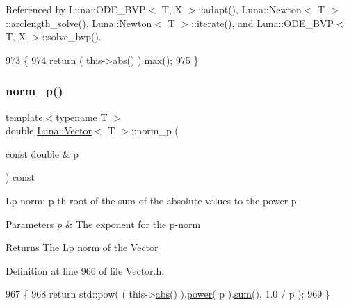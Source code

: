 Referenced by Luna\+::\+O\+D\+E\+\_\+\+B\+V\+P$<$ T, X $>$\+::adapt(), Luna\+::\+Newton$<$ T $>$\+::arclength\+\_\+solve(), Luna\+::\+Newton$<$ T $>$\+::iterate(), and Luna\+::\+O\+D\+E\+\_\+\+B\+V\+P$<$ T, X $>$\+::solve\+\_\+bvp().


\begin{DoxyCode}
973   \{
974     \textcolor{keywordflow}{return} ( this->\hyperlink{classLuna_1_1Vector_a1fe66d19f6641be9e301a306fdb58cbe}{abs}() ).max();
975   \}
\end{DoxyCode}
\mbox{\label{classLuna_1_1Vector_a3cc614bd51c84050cffc07f61b5238b2}} 
\subsubsection{\texorpdfstring{norm\+\_\+p()}{norm\_p()}}
{\footnotesize\ttfamily template$<$typename T $>$ \\
double \hyperlink{classLuna_1_1Vector}{Luna\+::\+Vector}$<$ T $>$\+::norm\+\_\+p (\begin{DoxyParamCaption}\item[{const double \&}]{p }\end{DoxyParamCaption}) const\hspace{0.3cm}{\ttfamily [inline]}}



Lp norm\+: p-\/th root of the sum of the absolute values to the power p. 


\begin{DoxyParams}{Parameters}
{\em p} & The exponent for the p-\/norm \\
\hline
\end{DoxyParams}
\begin{DoxyReturn}{Returns}
The Lp norm of the \hyperlink{classLuna_1_1Vector}{Vector} 
\end{DoxyReturn}


Definition at line 966 of file Vector.\+h.


\begin{DoxyCode}
967   \{
968     \textcolor{keywordflow}{return} std::pow( ( this->\hyperlink{classLuna_1_1Vector_a1fe66d19f6641be9e301a306fdb58cbe}{abs}() ).\hyperlink{classLuna_1_1Vector_ad691f671733f78bbf3bdbaf46fcbc5a0}{power}( p ).\hyperlink{classLuna_1_1Vector_a3f9422b246093b153a55577a6ca97e26}{sum}(), 1.0 / p );
969   \}
\end{DoxyCode}
\mbox{\label{classLuna_1_1Vector_aafaaa4c508431ed078c1599bcb7608be}} 
